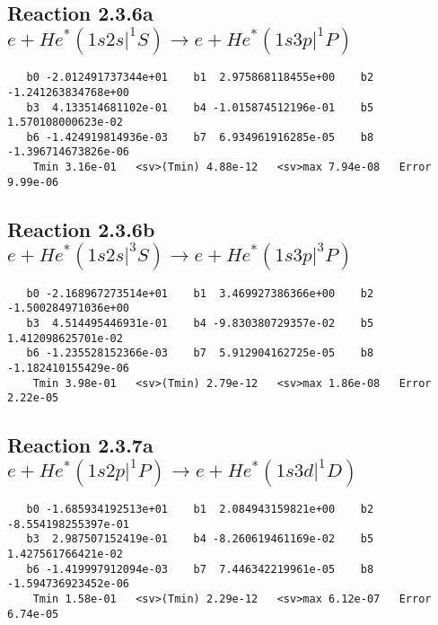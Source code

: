 \documentclass[12pt]{article}
\begin{document}
\newpage
\subsection{
Reaction 2.3.6a $  e + He^*(1s2s|^1S) \rightarrow e + He^*(1s3p|^1P)$}


\begin{small}\begin{verbatim}
   b0 -2.012491737344e+01    b1  2.975868118455e+00    b2 -1.241263834768e+00
   b3  4.133514681102e-01    b4 -1.015874512196e-01    b5  1.570108000623e-02
   b6 -1.424919814936e-03    b7  6.934961916285e-05    b8 -1.396714673826e-06
    Tmin 3.16e-01   <sv>(Tmin) 4.88e-12   <sv>max 7.94e-08   Error 9.99e-06
\end{verbatim}\end{small}

\newpage
\subsection{
Reaction 2.3.6b $  e + He^*(1s2s|^3S) \rightarrow e + He^*(1s3p|^3P)$}


\begin{small}\begin{verbatim}
   b0 -2.168967273514e+01    b1  3.469927386366e+00    b2 -1.500284971036e+00
   b3  4.514495446931e-01    b4 -9.830380729357e-02    b5  1.412098625701e-02
   b6 -1.235528152366e-03    b7  5.912904162725e-05    b8 -1.182410155429e-06
    Tmin 3.98e-01   <sv>(Tmin) 2.79e-12   <sv>max 1.86e-08   Error 2.22e-05
\end{verbatim}\end{small}

\newpage
\subsection{
Reaction 2.3.7a $  e + He^*(1s2p|^1P) \rightarrow e + He^*(1s3d|^1D)$}


\begin{small}\begin{verbatim}
   b0 -1.685934192513e+01    b1  2.084943159821e+00    b2 -8.554198255397e-01
   b3  2.987507152419e-01    b4 -8.260619461169e-02    b5  1.427561766421e-02
   b6 -1.419997912094e-03    b7  7.446342219961e-05    b8 -1.594736923452e-06
    Tmin 1.58e-01   <sv>(Tmin) 2.29e-12   <sv>max 6.12e-07   Error 6.74e-05
\end{verbatim}\end{small}
\end{document}
